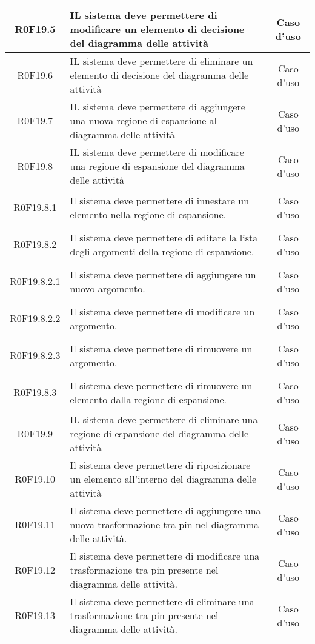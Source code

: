 \documentclass[../AnalisiDeiRequisiti.tex]{subfiles}
\begin{document}
\begin{longtable}{|c|>{\centering}p{7cm}|c|}
\hypertarget{R0F19.5}{R0F19.5} & IL sistema deve permettere di modificare un elemento di decisione del diagramma delle attività & Caso d'uso \\ \hline
\hypertarget{R0F19.6}{R0F19.6} & IL sistema deve permettere di eliminare un elemento di decisione del diagramma delle attività & Caso d'uso \\ \hline
\hypertarget{R0F19.7}{R0F19.7} & IL sistema deve permettere di aggiungere una nuova regione di espansione al diagramma delle attività & Caso d'uso \\ \hline
\hypertarget{R0F19.8}{R0F19.8} & IL sistema deve permettere di modificare una regione di espansione del diagramma delle attività & Caso d'uso \\ \hline
\hypertarget{R0F19.8.1}{R0F19.8.1} & Il sistema deve permettere di innestare un elemento nella regione di espansione. & Caso d'uso \\ \hline
\hypertarget{R0F19.8.2}{R0F19.8.2} & Il sistema deve permettere di editare la lista degli argomenti della regione di espansione. & Caso d'uso \\ \hline
\hypertarget{R0F19.8.2.1}{R0F19.8.2.1} & Il sistema deve permettere di aggiungere un nuovo argomento. & Caso d'uso \\ \hline
\hypertarget{R0F19.8.2.2}{R0F19.8.2.2} & Il sistema deve permettere di modificare un argomento. & Caso d'uso \\ \hline
\hypertarget{R0F19.8.2.3}{R0F19.8.2.3} & Il sistema deve permettere di rimuovere un argomento. & Caso d'uso \\ \hline
\hypertarget{R0F19.8.3}{R0F19.8.3} & Il sistema deve permettere di rimuovere un elemento dalla regione di espansione. & Caso d'uso \\ \hline
\hypertarget{R0F19.9}{R0F19.9} & IL sistema deve permettere di eliminare una regione di espansione del diagramma delle attività & Caso d'uso \\ \hline
\hypertarget{R0F19.10}{R0F19.10} & Il sistema deve permettere di riposizionare un elemento all'interno del diagramma delle attività & Caso d'uso \\ \hline
\hypertarget{R0F19.11}{R0F19.11} & Il sistema deve permettere di aggiungere una nuova trasformazione tra pin nel diagramma delle attività. & Caso d'uso \\ \hline
\hypertarget{R0F19.12}{R0F19.12} & Il sistema deve permettere di modificare una trasformazione tra pin presente nel diagramma delle attività. & Caso d'uso \\ \hline
\hypertarget{R0F19.13}{R0F19.13} & Il sistema deve permettere di eliminare una trasformazione tra pin presente nel diagramma delle attività. & Caso d'uso \\ \hline

\end{longtable}
\end{document}
